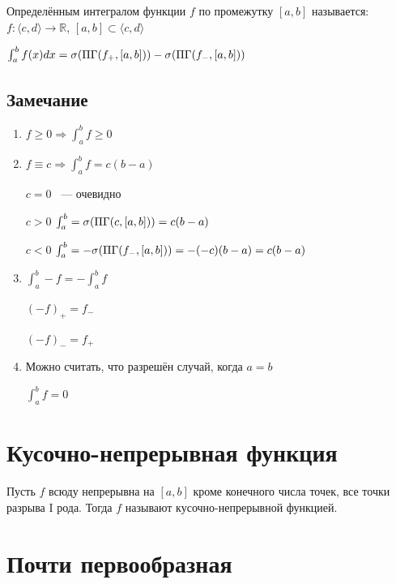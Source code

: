 \documentclass{article}
\begin{document}
            Определённым интегралом функции $f$ по промежутку $[a, b]$ называется: $f: \langle c, d \rangle \rightarrow \mathbb{R}$, $[a, b] \subset \langle c, d \rangle$
        
            $\int^b_a f(x)dx = \sigma (\Pi\Gamma (f_+, [a, b])) - \sigma (\Pi\Gamma (f_-, [a, b]))$
		
		\subsection{Замечание}
		
		    \begin{enumerate}
		    
		        \item $f \geq 0 \Rightarrow \int^b_a f \geq 0$
		        
		    	\item $f \equiv c \Rightarrow \int^b_a f = c(b - a)$
		        
		        	$c = 0$ ~--- очевидно
		            
		            $c > 0$ $\int^b_a = \sigma(\Pi\Gamma(c, [a, b])) = c(b - a)$
		            
		            $c < 0$ $\int^b_a = -\sigma(\Pi\Gamma(f_-, [a, b])) = -(-c)(b - a) = c(b - a)$
		            
		       \item $\int^b_a -f = - \int^b_a f$
		       
		       		$(-f)_+ = f_-$
		       		
		       		$(-f)_- = f_+$
		       		
		       \item Можно считать, что разрешён случай, когда $a = b$
		       
		       		$\int^b_a f = 0$
		       				
		    \end{enumerate}

	\newpage

	\section{Кусочно-непрерывная функция}
	
		Пусть $f$ всюду непрерывна на $[a, b]$ кроме конечного числа точек, все точки разрыва I рода. Тогда $f$ называют кусочно-непрерывной функцией.
		
	\newpage
	
	\section{Почти первообразная}
	
\end{document}
